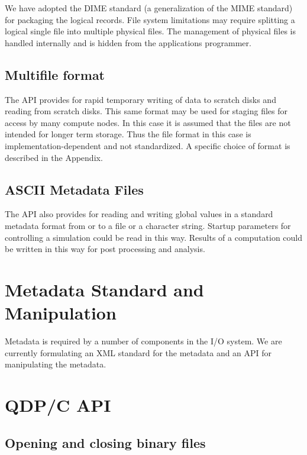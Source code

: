 \documentclass{article}
\begin{document}
We have adopted the DIME standard (a generalization of the MIME
standard) for packaging the logical records.  File system limitations
may require splitting a logical single file into multiple physical
files.  The management of physical files is handled internally and is
hidden from the applications programmer.

\subsection{Multifile format}

The API provides for rapid temporary writing of data to scratch disks
and reading from scratch disks.  This same format may be used for
staging files for access by many compute nodes.  In this case it is
assumed that the files are not intended for longer term storage.  Thus
the file format in this case is implementation-dependent and not
standardized.  A specific choice of format is described in the
Appendix.

\subsection{ASCII Metadata Files}

The API also provides for reading and writing global values in a
standard metadata format from or to a file or a character string.
Startup parameters for controlling a simulation could be read in this
way.  Results of a computation could be written in this way for post
processing and analysis.

\section{Metadata Standard and Manipulation}

Metadata is required by a number of components in the I/O system.  We
are currently formulating an XML standard for the metadata and an API
for manipulating the metadata.

\section{QDP/C API}

\subsection{Opening and closing binary files}
\end{document}
